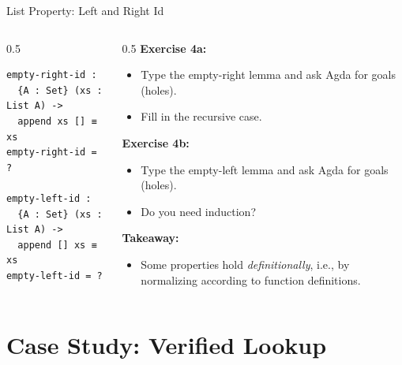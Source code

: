 \documentclass[aspectratio=169]{beamer}
\begin{document}
\begin{frame}[fragile]{List Property: Left and Right Id}
\begin{columns}
  \begin{column}{0.5\textwidth}
\begin{lstlisting}
empty-right-id :
  {A : Set} (xs : List A) ->
  append xs [] ≡ xs
empty-right-id = ?

empty-left-id :
  {A : Set} (xs : List A) ->
  append [] xs ≡ xs
empty-left-id = ?
\end{lstlisting}
    
  \end{column}
  \begin{column}{0.5\textwidth}
    \textbf{Exercise 4a:}
    \begin{itemize}
      \item Type the empty-right lemma and ask Agda for goals (holes).
      \item Fill in the recursive case.
    \end{itemize}
    \vspace{1em}
    \textbf{Exercise 4b:}
    \begin{itemize}
      \item Type the empty-left lemma and ask Agda for goals (holes).
      \item Do you need induction?
    \end{itemize}
    \vspace{1em}
    \pause
    \textbf{Takeaway:}
    \begin{itemize}
      \item Some properties hold \emph{definitionally}, i.e., by normalizing according to function definitions.
    \end{itemize}
  \end{column}
\end{columns}
\end{frame}

\section{Case Study: Verified Lookup}
\end{document}
